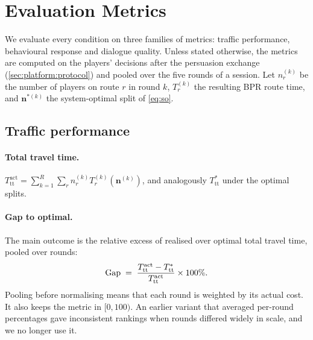 \section{Evaluation Metrics}
\label{sec:metrics}

We evaluate every condition on three families of metrics: traffic performance, behavioural response and dialogue quality. Unless stated otherwise, the metrics are computed on the players' decisions after the persuasion exchange (\cref{sec:platform:protocol}) and pooled over the five rounds of a session. Let $n_r^{(k)}$ be the number of players on route $r$ in round $k$, $T_r^{(k)}$ the resulting BPR route time, and $\mathbf{n}^{\ast(k)}$ the system-optimal split of \cref{eq:so}.

\subsection{Traffic performance}
\paragraph{Total travel time.}
$T^{\mathrm{act}}_{\mathrm{tt}} = \sum_{k=1}^{R} \sum_{r} n_r^{(k)} T_r^{(k)}(\mathbf{n}^{(k)})$, and analogously $T^{\ast}_{\mathrm{tt}}$ under the optimal splits.

\paragraph{Gap to optimal.} The main outcome is the relative excess of realised over optimal total travel time, pooled over rounds:
\begin{equation}
  \mathrm{Gap} \;=\; \frac{T^{\mathrm{act}}_{\mathrm{tt}} - T^{\ast}_{\mathrm{tt}}}{T^{\mathrm{act}}_{\mathrm{tt}}} \times 100\%.
  \label{eq:gap}
\end{equation}
Pooling before normalising means that each round is weighted by its actual cost. It also keeps the metric in $[0, 100)$. An earlier variant that averaged per-round percentages gave inconsistent rankings when rounds differed widely in scale, and we no longer use it.

